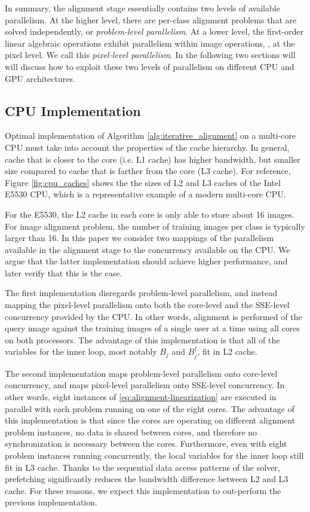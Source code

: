 \documentclass[10pt,twocolumn,letterpaper]{article}
\begin{document}
In summary, the alignment stage essentially contains two levels of available
parallelism. At the higher level, there are per-class alignment problems
that are solved independently, or \emph{problem-level parallelism}.  At a lower
level, the first-order linear algebraic operations exhibit parallelism within
image operations, \ie, at the pixel level.  We call this \emph{pixel-level
parallelism}.  In the following two sections will will discuss how to
exploit these two levels of parallelism on different CPU and GPU architectures.

\subsection{CPU Implementation} 
\label{sec:alignment_implementation_cpu}

Optimal implementation of Algorithm \ref{alg:iterative_alignment} on a multi-core CPU must take 
into account the properties of the cache hierarchy. In general, cache that is 
closer to the core (i.e. L1 cache) has higher bandwidth, but smaller size compared to cache
that is farther from the core (L3 cache).  For reference, Figure \ref{fig:cpu_caches} 
shows the the sizes of L2 and L3 caches of the Intel E5530 CPU, 
which is a representative example of a modern multi-core CPU. 

For the E5530, the L2 cache in each core is only able to store about 16 images.
For image alignment problem, the number of training images per class is
typically larger than 16.  
In this paper we consider two mappings of the parallelism available in the alignment
stage to the concurrency available on the CPU.  We argue that the latter
implementation should achieve higher performance, and later verify that this is the case.

The first implementation disregards 
problem-level parallelism, and instead mapping the pixel-level parallelism
onto both the core-level and the SSE-level concurrency provided by the CPU.  In
other words, alignment is performed of the query
image against the training images of a single user at a time using all cores on
both processors.  The advantage of this implementation is that all of the variables
for the inner loop, most notably $B_j$ and $B_j^\dagger$, fit in L2 cache.  

The second implementation maps problem-level parallelism onto core-level
concurrency, and maps pixel-level parallelism onto SSE-level concurrency.  In
other words, eight instances of \eqref{eq:alignment-linearization} are executed
in parallel with each problem running on one of the eight cores.  The advantage
of this implementation is that since the cores are operating on different
alignment problem instances, no data is shared between cores, and therefore no
synchronization is necessary between the cores.  Furthermore, even with eight
problem instances running concurrently, the local variables for the inner
loop still fit in L3 cache.  Thanks to the sequential data access patterns of
the solver, prefetching significantly reduces the bandwidth difference between
L2 and L3 cache.  For these reasons, we expect this implementation to out-perform
the previous implementation.
\end{document}
